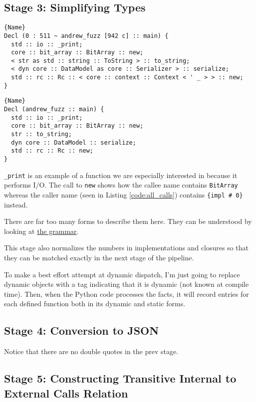 \documentclass[11pt]{article}
\begin{document}
\subsection{Stage 3: Simplifying Types}

\begin{lstlisting}[caption=Before Simplifying Types, label=before_simplify_types]{Name}
Decl (0 : 511 ~ andrew_fuzz [942 c] :: main) {
  std :: io :: _print;
  core :: bit_array :: BitArray :: new;
  < str as std :: string :: ToString > :: to_string;
  < dyn core :: DataModel as core :: Serializer > :: serialize;
  std :: rc :: Rc :: < core :: context :: Context < ' _ > > :: new;
}
\end{lstlisting}
\begin{lstlisting}[caption=After Simplifying Types, label=after_simplifying_types]{Name}
Decl (andrew_fuzz :: main) {
  std :: io :: _print;
  core :: bit_array :: BitArray :: new;
  str :: to_string;
  dyn core :: DataModel :: serialize;
  std :: rc :: Rc :: new;
}
\end{lstlisting}

\lstinline{_print} is an example of a function we are especially interested in because it performs I/O.
The call to \lstinline{new} shows how the callee name contains \lstinline{BitArray} whereas the caller name (seen in Listing \ref{code:all_calls}) contains \lstinline|{impl # 0}| instead.

There are far too many forms to describe them here.
They can be understood by looking at \href{https://github.com/Andrew-Fryer/external_function_annotation/blob/master/simplify_types.txl#L49}{the grammar}.

This stage also normalizes the numbers in implementations and closures so that they can be matched exactly in the next stage of the pipeline.

To make a best effort attempt at dynamic dispatch, I'm just going to replace dynamic objects with a tag indicating that it is dynamic (not known at compile time).
Then, when the Python code processes the facts, it will record entries for each defined function both in its dynamic and static forms.

\subsection{Stage 4: Conversion to JSON}

Notice that there are no double quotes in the prev stage.

\subsection{Stage 5: Constructing Transitive Internal to External Calls Relation}
\end{document}
